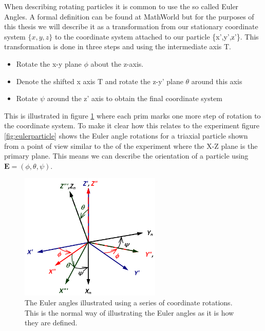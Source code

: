 When describing rotating particles it is common to use the so called Euler Angles. A formal definition can be found at MathWorld \cite{eulerAngles} but for the purposes of this thesis we will describe it as a transformation from our stationary coordinate system $\{x,y,z\}$ to the coordinate system attached to our particle \{x',y',z'\}. This transformation is done in three steps and using the intermediate axis T.

\begin{itemize}
\item Rotate the x-y plane $\phi$ about the z-axis.
\item Denote the shifted x axis T and rotate the z-y' plane $\theta$ around this axis
\item Rotate $\psi$ around the z' axis to obtain the final coordinate system
\end{itemize}

This is illustrated in figure \ref{fig:eulerangles} where each prim marks one more step of rotation to the coordinate system. To make it clear how this relates to the experiment figure \ref{fig:eulerparticle} shows the Euler angle rotations for a triaxial particle shown from a point of view similar to the of the experiment where the X-Z plane is the primary plane. This means we can describe the orientation of a particle using $\mathbf{E} = (\phi, \theta, \psi)$.

\begin{figure}[H]
\begin{center}
\includegraphics[width=0.6\textwidth]{figures/theory/eulerangles.png}
\end{center}
\caption{The Euler angles illustrated using a series of coordinate rotations. This is the normal way of illustrating the Euler angles as it is how they are defined.}
\label{fig:eulerangles}
\end{figure}



